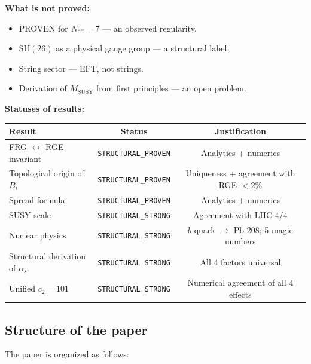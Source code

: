 \documentclass[11pt,a4paper]{article}
\newcommand{\SU}{\ensuremath{\mathrm{SU}}}
\newcommand{\Neff}{\ensuremath{N_{\text{eff}}}}
\newcommand{\MSUSY}{\ensuremath{M_{\text{SUSY}}}}
\theoremstyle{definition}
\begin{document}
\medskip\noindent
\textbf{What is not proved:}
\begin{itemize}
    \item PROVEN for $\Neff = 7$ --- an observed regularity.
    \item $\SU(26)$ as a physical gauge group ---
          a structural label.
    \item String sector --- EFT, not strings.
    \item Derivation of $\MSUSY$ from first principles --- an open problem.
\end{itemize}

\medskip\noindent
\textbf{Statuses of results:}
\begin{center}
\begin{tabular}{lcc}
\toprule
Result & Status & Justification \\
\midrule
FRG $\leftrightarrow$ RGE invariant & \texttt{STRUCTURAL\_PROVEN} &
Analytics + numerics \\
Topological origin of $B_i$ & \texttt{STRUCTURAL\_PROVEN} &
Uniqueness + agreement with RGE $< 2\%$ \\
Spread formula & \texttt{STRUCTURAL\_PROVEN} &
Analytics + numerics \\
SUSY scale & \texttt{STRUCTURAL\_STRONG} &
Agreement with LHC 4/4 \\[0.3em]
Nuclear physics & \texttt{STRUCTURAL\_STRONG} &
$b$-quark $\to$ Pb-208; 5 magic numbers \\[0.3em]
Structural derivation of $\alpha_s$ & \texttt{STRUCTURAL\_STRONG} &
All 4 factors universal \\[0.3em]
Unified $c_2 = 101$ & \texttt{STRUCTURAL\_STRONG} &
Numerical agreement of all 4 effects \\
\bottomrule
\end{tabular}
\end{center}

\subsection{Structure of the paper}

The paper is organized as follows:
\end{document}
